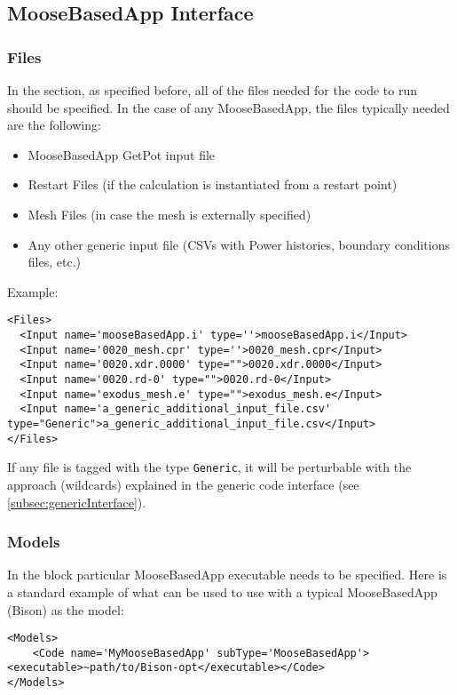 \subsection{MooseBasedApp Interface}
\subsubsection{Files}
In the  section, as specified before, all of the files needed for
the code to run should be specified.
%
In the case of any MooseBasedApp, the files typically needed are the following:
\begin{itemize}
  \item MooseBasedApp GetPot input file
  \item Restart Files (if the calculation is instantiated from a restart point)
  \item Mesh Files (in case the mesh is externally specified)
  \item Any other generic input file (CSVs with Power histories, boundary conditions files, etc.)
\end{itemize}
Example:
\begin{lstlisting}[style=XML]
<Files>
  <Input name='mooseBasedApp.i' type=''>mooseBasedApp.i</Input>
  <Input name='0020_mesh.cpr' type=''>0020_mesh.cpr</Input>
  <Input name='0020.xdr.0000' type="">0020.xdr.0000</Input>
  <Input name='0020.rd-0' type="">0020.rd-0</Input>
  <Input name='exodus_mesh.e' type="">exodus_mesh.e</Input>
  <Input name='a_generic_additional_input_file.csv' type="Generic">a_generic_additional_input_file.csv</Input>
</Files>
\end{lstlisting}
If any file is tagged with the type \texttt{Generic}, it will be perturbable with the approach (wildcards)
 explained in the generic code interface (see  \ref{subsec:genericInterface}).



\subsubsection{Models}
In the  block particular MooseBasedApp executable needs to be specified.
%
Here is a standard example of what can be used to use with a typical MooseBasedApp (Bison) as the model:
\begin{lstlisting}[style=XML]
<Models>
    <Code name='MyMooseBasedApp' subType='MooseBasedApp'><executable>~path/to/Bison-opt</executable></Code>
</Models>
\end{lstlisting}
